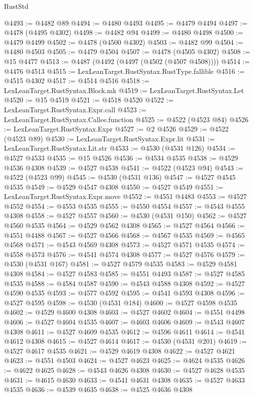\begin{lexlean}{RustStd}
\begin{coremodule}
@4493 := @4482 @89
@4494 := @4480 @4493
@4495 := @4479 @4494
@4497 := @4478 (@4495 @4302)
@4498 := @4482 @94
@4499 := @4480 @4498
@4500 := @4479 @4499
@4502 := @4478 (@4500 @4302)
@4503 := @4482 @99
@4504 := @4480 @4503
@4505 := @4479 @4504
@4507 := @4478 (@4505 @4302)
@4508 := @15 @4477
@4513 := @4487 (@4492 (@4497 (@4502 (@4507 @4508))))
@4514 := @4476 @4513
@4515 := LexLeanTarget.RustSyntax.RustType.fallible
@4516 := @4515 @4302
@4517 := @4514 @4516
@4518 := LexLeanTarget.RustSyntax.Block.mk
@4519 := LexLeanTarget.RustSyntax.Let
@4520 := @15 @4519
@4521 := @4518 @4520
@4522 := LexLeanTarget.RustSyntax.Expr.call
@4523 := LexLeanTarget.RustSyntax.Callee.function
@4525 := @4522 (@4523 @84)
@4526 := LexLeanTarget.RustSyntax.Expr
@4527 := @2 @4526
@4529 := @4522 (@4523 @89)
@4530 := LexLeanTarget.RustSyntax.Expr.lit
@4531 := LexLeanTarget.RustSyntax.Lit.str
@4533 := @4530 (@4531 @126)
@4534 := @4527 @4533
@4535 := @15 @4526
@4536 := @4534 @4535
@4538 := @4529 @4536 @4308
@4539 := @4527 @4538
@4541 := @4522 (@4523 @94)
@4543 := @4522 (@4523 @99)
@4545 := @4530 (@4531 @136)
@4547 := @4527 @4545 @4535
@4549 := @4529 @4547 @4308
@4550 := @4527 @4549
@4551 := LexLeanTarget.RustSyntax.Expr.move
@4552 := @4551 @4483
@4553 := @4527 @4552
@4554 := @4553 @4535
@4555 := @4550 @4554
@4557 := @4543 @4555 @4308
@4558 := @4527 @4557
@4560 := @4530 (@4531 @150)
@4562 := @4527 @4560 @4535
@4564 := @4529 @4562 @4308
@4565 := @4527 @4564
@4566 := @4551 @4488
@4567 := @4527 @4566
@4568 := @4567 @4535
@4569 := @4565 @4568
@4571 := @4543 @4569 @4308
@4573 := @4527 @4571 @4535
@4574 := @4558 @4573
@4576 := @4541 @4574 @4308
@4577 := @4527 @4576
@4579 := @4530 (@4531 @167)
@4581 := @4527 @4579 @4535
@4583 := @4529 @4581 @4308
@4584 := @4527 @4583
@4585 := @4551 @4493
@4587 := @4527 @4585 @4535
@4588 := @4584 @4587
@4590 := @4543 @4588 @4308
@4592 := @4527 @4590 @4535
@4593 := @4577 @4592
@4595 := @4541 @4593 @4308
@4596 := @4527 @4595
@4598 := @4530 (@4531 @184)
@4600 := @4527 @4598 @4535
@4602 := @4529 @4600 @4308
@4603 := @4527 @4602
@4604 := @4551 @4498
@4606 := @4527 @4604 @4535
@4607 := @4603 @4606
@4609 := @4543 @4607 @4308
@4611 := @4527 @4609 @4535
@4612 := @4596 @4611
@4614 := @4541 @4612 @4308
@4615 := @4527 @4614
@4617 := @4530 (@4531 @201)
@4619 := @4527 @4617 @4535
@4621 := @4529 @4619 @4308
@4622 := @4527 @4621
@4623 := @4551 @4503
@4624 := @4527 @4623
@4625 := @4624 @4535
@4626 := @4622 @4625
@4628 := @4543 @4626 @4308
@4630 := @4527 @4628 @4535
@4631 := @4615 @4630
@4633 := @4541 @4631 @4308
@4635 := @4527 @4633 @4535
@4636 := @4539 @4635
@4638 := @4525 @4636 @4308

\end{coremodule}
\end{lexlean}
